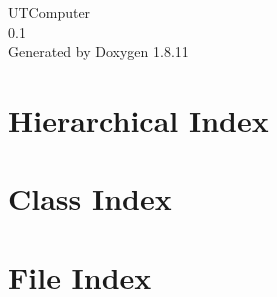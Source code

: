 \documentclass[twoside]{book}
\newcommand{\+}{\discretionary{\mbox{\scriptsize$\hookleftarrow$}}{}{}}
\newcommand{\clearemptydoublepage}{%
  \newpage{\pagestyle{empty}\cleardoublepage}%
}
\begin{document}
\hypersetup{pageanchor=false,
             bookmarksnumbered=true,
             pdfencoding=unicode
            }
\begin{titlepage}
\vspace*{7cm}
\begin{center}%
{\Large U\+T\+Computer \\[1ex]\large 0.\+1 }\\
\vspace*{1cm}
{\large Generated by Doxygen 1.8.11}\\
\end{center}
\end{titlepage}
\clearemptydoublepage
\tableofcontents
\clearemptydoublepage
{}
\hypersetup{pageanchor=true}

\chapter{Hierarchical Index}

\chapter{Class Index}

\chapter{File Index}

\end{document}
